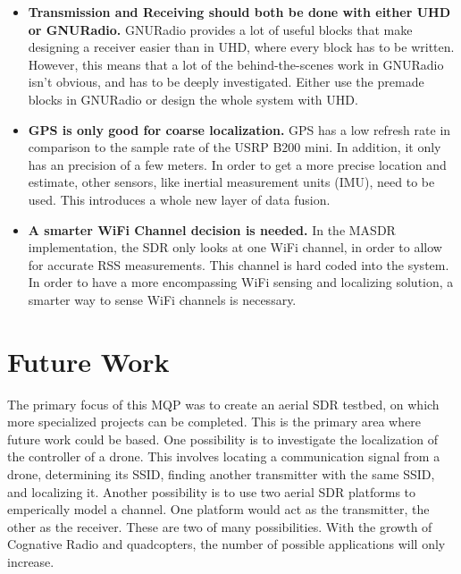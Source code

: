 \begin{itemize}
 \item \textbf{Transmission and Receiving should both be done with either UHD or GNURadio.} 
                GNURadio provides a lot of useful blocks that make designing a receiver easier than in
                UHD, where every block has to be written. However, this means that a lot of the behind-the-scenes
                work in GNURadio isn't obvious, and has to be deeply investigated. Either use the premade blocks 
                in GNURadio or design the whole system with UHD.
 \item \textbf{GPS is only good for coarse localization.} 
                GPS has a low refresh rate in comparison to the 
                sample rate of the USRP B200 mini. In addition, it only has an precision of
                a few meters. In order to get a more precise location and estimate,
                other sensors, like inertial measurement units (IMU), need to be used. 
                This introduces a whole new layer of data fusion.
 \item \textbf{A smarter WiFi Channel decision is needed.} 
                In the MASDR implementation, the SDR
                only looks at one WiFi channel, in order to allow for accurate RSS measurements. 
                This channel is hard coded into the system. In order to have a more encompassing 
                WiFi sensing and localizing solution, a smarter way to sense WiFi channels is 
                necessary.
\end{itemize} \par

\section{Future Work}
The primary focus of this MQP was to create an aerial SDR testbed, on which more 
specialized projects can be completed. This is the primary area where future work
could be based. One possibility is to investigate the localization of the controller
of a drone. This involves locating a communication signal from a drone, determining its
SSID, finding another transmitter with the same SSID, and localizing it. Another possibility
is to use two aerial SDR platforms to emperically model a channel. One platform
would act as the transmitter, the other as the receiver. These are two of many possibilities.
With the growth of Cognative Radio and quadcopters, the number of possible applications
will only increase.\par

